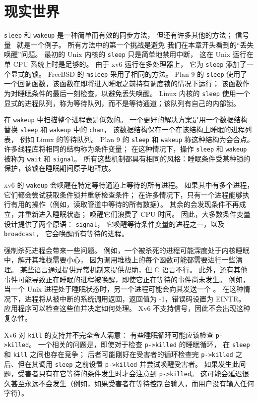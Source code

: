 \section{现实世界}

\lstinline{sleep}
和
\lstinline{wakeup}
是一种简单而有效的同步方法，
但还有许多其他的方法；
信号量~\cite{dijkstra65} 就是一个例子。
所有方法中的第一个挑战是避免
我们在本章开头看到的“丢失唤醒”问题。
最初的 Unix 内核的
\lstinline{sleep}
只是简单地禁用中断，
这在 Unix 运行在单 CPU 系统上时是足够的。
由于 xv6 运行在多处理器上，
它为
\lstinline{sleep}
添加了一个显式的锁。
FreeBSD 的
\lstinline{msleep}
采用了相同的方法。
Plan 9 的
\lstinline{sleep}
使用了一个回调函数，该函数在即将进入睡眠之前持有调度锁的情况下运行；
该函数作为对睡眠条件的最后一刻检查，以避免丢失唤醒。
Linux 内核的
\lstinline{sleep}
使用一个显式的进程队列，称为等待队列，而不是等待通道；该队列有自己的内部锁。

在 \lstinline{wakeup} 中扫描整个进程表是低效的。
一个更好的解决方案是用一个数据结构替换
\lstinline{sleep}
和
\lstinline{wakeup}
中的
\lstinline{chan}，
该数据结构保存一个在该结构上睡眠的进程列表，
例如 Linux 的等待队列。
Plan 9 的
\lstinline{sleep}
和
\lstinline{wakeup}
称这种结构为会合点。
许多线程库将相同的结构称为条件变量；
在这种情况下，操作
\lstinline{sleep}
和
\lstinline{wakeup}
被称为
\lstinline{wait}
和
\lstinline{signal}。
所有这些机制都具有相同的风格：睡眠条件受某种锁的保护，该锁在睡眠期间原子地释放。

xv6 的
\lstinline{wakeup}
会唤醒在特定等待通道上等待的所有进程。
如果其中有多个进程，它们都会尝试获取条件锁并重新检查条件；
在许多情况下，只有一个进程能够执行有用的操作（例如，读取管道中等待的所有数据）。
其余的会发现条件不再成立，并重新进入睡眠状态；
唤醒它们浪费了 CPU 时间。
因此，大多数条件变量设计提供了两个原语：
\lstinline{signal}，
它唤醒等待条件变量的进程之一，以及
\lstinline{broadcast}，
它会唤醒所有等待的进程。

强制杀死进程会带来一些问题。
例如，一个被杀死的进程可能深度处于内核睡眠中，解开其堆栈需要小心，
因为调用堆栈上的每个函数可能都需要进行一些清理。
某些语言通过提供异常机制来提供帮助，但 C 语言不行。
此外，还有其他事件可能导致正在睡眠的进程被唤醒，即使它正在等待的事件尚未发生。
例如，当一个 Unix 进程处于睡眠状态时，另一个进程可能会向其发送一个
。
在这种情况下，进程将从被中断的系统调用返回，返回值为 -1，错误码设置为 EINTR。
应用程序可以检查这些值并决定如何处理。
Xv6 不支持信号，因此不会出现这种复杂性。

Xv6 对 \lstinline{kill} 的支持并不完全令人满意：
有些睡眠循环可能应该检查 \lstinline{p->killed}。
一个相关的问题是，即使对于检查 \lstinline{p->killed} 的睡眠循环，
在 \lstinline{sleep} 和 \lstinline{kill} 之间也存在竞争；
后者可能刚好在受害者的循环检查完 \lstinline{p->killed} 之后、但在其调用 \lstinline{sleep} 之前设置 \lstinline{p->killed} 并尝试唤醒受害者。
如果发生此问题，受害者只有在它等待的条件发生时才会注意到 \lstinline{p->killed}。
这可能会延迟很久甚至永远不会发生（例如，如果受害者在等待控制台输入，而用户没有输入任何字符）。

